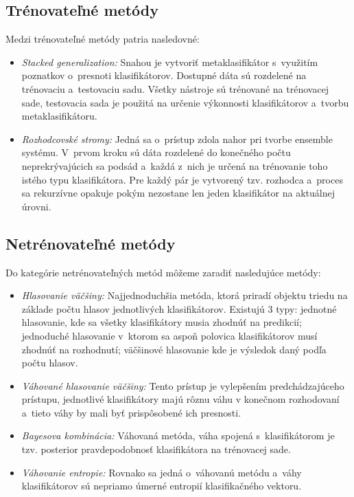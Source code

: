 \subsection{Trénovateľné metódy}
Medzi trénovateľné metódy patria nasledovné:
\begin{itemize}
	\item \textit{Stacked generalization:} Snahou je vytvoriť metaklasifikátor s~využitím poznatkov o~presnoti klasifikátorov. Dostupné dáta sú rozdelené na trénovaciu a~testovaciu sadu. Všetky nástroje sú trénované na trénovacej sade, testovacia sada je použitá na určenie výkonnosti klasifikátorov a~tvorbu metaklasifikátoru.
	\item \textit{Rozhodcovské stromy:} Jedná sa o~prístup zdola nahor pri tvorbe ensemble systému. V~prvom kroku sú dáta rozdelené do konečného počtu neprekrývajúcich sa podsád a~každá z~nich je určená na trénovanie toho istého typu klasifikátora. Pre každý pár je vytvorený tzv. rozhodca a~proces sa rekurzívne opakuje pokým nezostane len jeden klasifikátor na aktuálnej úrovni. 
\end{itemize}

\subsection{Netrénovateľné metódy}

Do kategórie netrénovateľných metód môžeme zaradiť nasledujúce metódy:
\begin{itemize}
	\item \textit{Hlasovanie väčšiny:} Najjednoduchšia metóda, ktorá priradí objektu triedu na základe počtu hlasov jednotlivých klasifikátorov. Existujú 3 typy: jednotné hlasovanie, kde sa všetky klasifikátory musia zhodnúť na predikcií; jednoduché hlasovanie v~ktorom sa aspoň polovica klasifikátorov musí zhodnúť na rozhodnutí; väčšinové hlasovanie kde je výsledok daný podľa počtu hlasov.
	\item \textit{Váhované hlasovanie väčšiny:} Tento prístup je vylepšením predchádzajúceho prístupu, jednotlivé klasifikátory majú rôznu váhu v konečnom rozhodovaní a~tieto váhy by mali byť prispôsobené ich presnosti.
	\item \textit{Bayesova kombinácia:} Váhovaná metóda, váha spojená s~klasifikátorom je tzv. posterior pravdepodobnosť klasifikátora na trénovacej sade.
	\item \textit{Váhovanie entropie:} Rovnako sa jedná o~váhovanú metódu a~váhy klasifikátorov sú nepriamo úmerné entropií klasifikačného vektoru.
\end{itemize}


